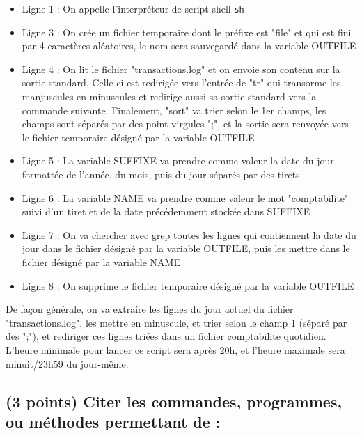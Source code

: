 \documentclass[11pt,a4paper]{article}
\begin{document}
\bigskip

\begin{itemize}
\item Ligne 1 : On appelle l'interpréteur de script shell \texttt{sh}
\item Ligne 3 : On crée un fichier temporaire dont le préfixe est "file" et qui est fini par 4 caractères aléatoires, le nom sera sauvegardé dans la variable OUTFILE
\item Ligne 4 : On lit le fichier "transactions.log" et on envoie son contenu sur la sortie standard. Celle-ci est redirigée vers l'entrée de "tr" qui transorme les manjuscules en minuscules et redirige aussi sa sortie standard vers la commande suivante. Finalement, "sort" va trier selon le 1er champs, les champs sont séparés par des point virgules ";", et la sortie sera renvoyée vers le fichier temporaire désigné par la variable OUTFILE
\item Ligne 5 : La variable SUFFIXE va prendre comme valeur la date du jour formattée de l'année, du mois, puis du jour séparés par des tirets
\item Ligne 6 : La variable NAME va prendre comme valeur le mot "comptabilite" suivi d'un tiret et de la date précédemment stockée dans SUFFIXE
\item Ligne 7 : On va chercher avec grep toutes les lignes qui contiennent la date du jour dans le fichier désigné par la variable OUTFILE, puis les mettre dans le fichier désigné par la variable NAME
\item Ligne 8 : On supprime le fichier temporaire désigné par la variable OUTFILE
\end{itemize}

De façon générale, on va extraire les lignes du jour actuel du fichier "transactions.log", les mettre en minuscule, et trier selon le champ 1 (séparé par des ";"), et rediriger ces lignes triées dans un fichier comptabilite quotidien.\\

L'heure minimale pour lancer ce script sera après 20h, et l'heure maximale sera minuit/23h59 du jour-même.

\bigskip

\pagebreak

\subsection{(3 points) Citer les commandes, programmes, ou méthodes permettant de :}
\end{document}
